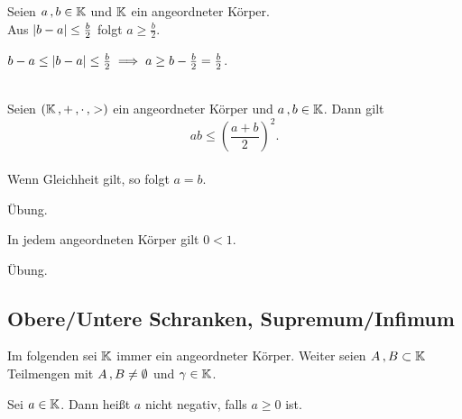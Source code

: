 \documentclass[../ana1.tex]{subfiles}
\begin{document}
\begin{bsp}
	Seien \(a \operatorname{,} b \in \mathbb{K}\) und \(\mathbb{K}\) ein angeordneter Körper.\\
	Aus \(\left|b - a\right| \leq \frac{b}{2}\) folgt \(a \geq \frac{b}{2}\).
\end{bsp}
\begin{bew}
	\(b-a \leq \left|b-a\right| \leq \frac{b}{2} \implies a \geq b - \frac{b}{2} = \frac{b}{2}\).
\end{bew}

\begin{kor}\label{kor:gaungl}\leavevmode\\
	Seien \((\mathbb{K} \operatorname{,} + \operatorname{,} \cdot \operatorname{,} >)\) ein angeordneter Körper und \(a \operatorname{,} b \in \mathbb{K}\). Dann gilt\\
		\[ab \leq \left( \frac{a + b}{2}\right)^{2}.\]\\
	Wenn Gleichheit gilt, so folgt \(a=b\).
\end{kor}
\begin{bew}
	Übung.\phantom{\qedhere}
\end{bew}

\begin{bem}
	In jedem angeordneten Körper gilt \(0 < 1\).
\end{bem}
\begin{bew}
	Übung.\phantom{\qedhere}
\end{bew}


\subsection{Obere/Untere Schranken, Supremum/Infimum}
\begin{prosa}
	Im folgenden sei \(\mathbb{K}\) immer ein angeordneter Körper. Weiter seien \(A \operatorname{,} B \subset \mathbb{K}\) Teilmengen mit \(A \operatorname{,} B \neq \emptyset\) und
	\(\gamma \in \mathbb{K}\).
\end{prosa}

\begin{notation}
	Sei \(a \in \mathbb{K}\). Dann heißt \(a\) nicht negativ, falls \(a \geq 0\) ist.
\end{notation}
\end{document}
